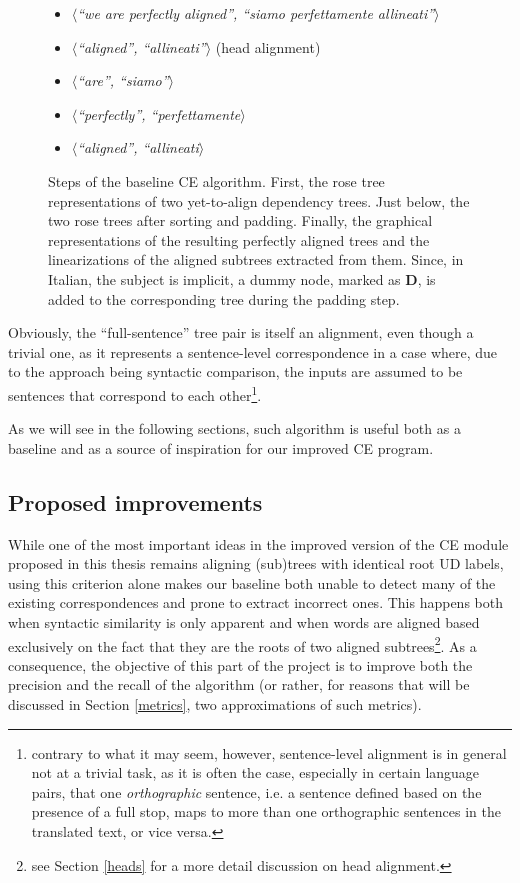 \begin{figure}[H]
\begin{itemize}
 \item $\langle$\textit{``we are perfectly aligned'', ``siamo perfettamente allineati''}$\rangle$
 \item $\langle$\textit{``aligned'', ``allineati''}$\rangle$ (head alignment)
 \item $\langle$\textit{``are'', ``siamo''}$\rangle$
 \item $\langle$\textit{``perfectly'', ``perfettamente}$\rangle$
 \item $\langle$\textit{``aligned'', ``allineati}$\rangle$
 \end{itemize}
 \caption[Steps of the baseline CE algorithm.]{Steps of the baseline CE algorithm. First, the rose tree representations of two yet-to-align dependency trees. Just below, the two rose trees after sorting and padding. Finally, the graphical representations of the resulting perfectly aligned trees and the linearizations of the aligned subtrees extracted from them. Since, in Italian, the subject is implicit, a dummy node, marked as \textbf{D}, is added to the corresponding tree during the padding step.}
 \label{prefal}
\end{figure}

Obviously, the ``full-sentence'' tree pair is itself an alignment, even though a trivial one, as it represents a sentence-level correspondence in a case where, due to the approach being syntactic comparison, the inputs are assumed to be sentences that correspond to each other\footnote{contrary to what it may seem, however, sentence-level alignment is in general not at a trivial task, as it is often the case, especially in certain language pairs, that one \textit{orthographic} sentence, i.e. a sentence defined based on the presence of a full stop, maps to more than one orthographic sentences in the translated text, or vice versa.}.

As we will see in the following sections, such algorithm is useful both as a baseline and as a source of inspiration for our improved CE program.

\subsection{Proposed improvements} \label{improvements}
While one of the most important ideas in the improved version of the CE module proposed in this thesis remains aligning (sub)trees with identical root UD labels, using this criterion alone makes our baseline both unable to detect many of the existing correspondences and prone to extract incorrect ones. This happens both when syntactic similarity is only apparent and when words are aligned based exclusively on the fact that they are the roots of two aligned subtrees\footnote{see Section \ref{heads} for a more detail discussion on head alignment.}.
As a consequence, the objective of this part of the project is to improve both the precision and the recall of the algorithm (or rather, for reasons that will be discussed in Section \ref{metrics}, two approximations of such metrics). 

